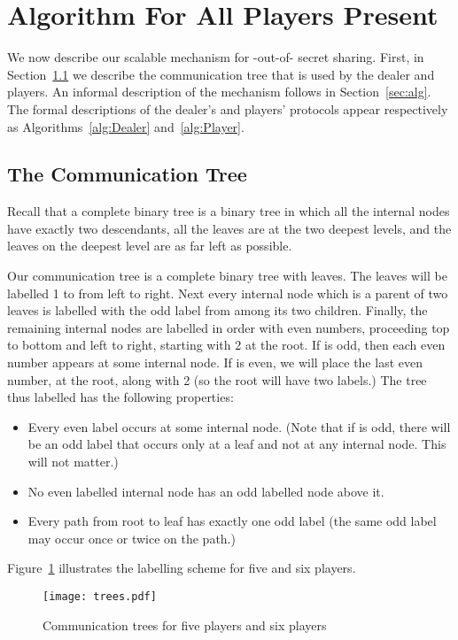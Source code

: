 \documentclass[12pt]{article}
\theoremstyle{definition}
\begin{document}
\section{Algorithm For All Players Present}
\label{s:algnofn}
We now describe our scalable mechanism for -out-of- secret
sharing. First, in Section~\ref{sec:commtree} we describe the communication 
tree that is used by the dealer and players. An informal description
of the mechanism follows in Section~\ref{sec:alg}. The formal descriptions 
of the dealer's and players' protocols 
appear respectively as Algorithms~\ref{alg:Dealer} and~\ref{alg:Player}.


\subsection{The Communication Tree}\label{sec:commtree}


Recall that a complete binary tree is a binary tree in which all the 
internal nodes have exactly two descendants, all the leaves are at the 
two deepest levels, and the leaves on the deepest level are as far left 
as possible.

Our communication tree is a complete binary tree with  leaves. 
The leaves will be labelled 1 to  from left to right. Next every 
internal node which is a parent of two leaves is labelled with the 
odd label from among its two children. Finally, the remaining internal 
nodes are labelled in order with even numbers, proceeding top to bottom and left to right, starting with 2 at the root. If  is odd, then each even number
appears at some internal node. If  is even, we will place the last 
even number,  at the root, along with 2 (so the root will have two labels.)
The tree thus labelled has the following properties:
\begin{itemize}
\item Every even label occurs at some internal node. (Note that if  is 
odd, there will be an odd label that occurs only at a leaf and not at any 
internal node. This will not matter.)
\item No even labelled internal node has an odd labelled node above it.
\item Every path from root to leaf has exactly one odd label (the same odd 
label may occur once or twice on the path.)
\end{itemize}
Figure~\ref{fig:tree} illustrates the labelling scheme for five and six players.

\begin{figure}
\begin{center}
\texttt{[image: trees.pdf]}
\end{center}
\caption{Communication trees for five players and six players}
\label{fig:tree}
\end{figure}
\end{document}
